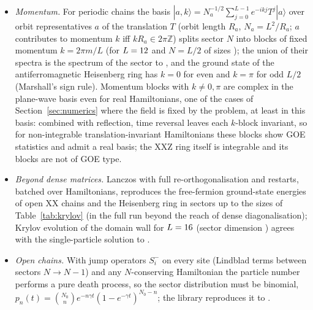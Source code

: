 \documentclass[11pt]{article}
\begin{document}
\begin{itemize}
level spacings in the middle of the spectrum crosses over from the GOE value $0.5307$ to the Poisson value
$2\ln2-1\approx0.3863$~\cite{oganesyan2007,atas2013} as $W$ grows; at these sizes this is a finite-size crossover,
the standard spectral diagnostic used in studies of many-body localisation.
Here the batch dimension holds the disorder realisations
( per point).
\item \emph{Momentum.} For periodic chains the basis $|a,k\rangle=N_a^{-1/2}\sum_{j=0}^{L-1}e^{-ikj}T^j|a\rangle$ over
orbit representatives $a$ of the translation $T$ (orbit length $R_a$, $N_a=L^2/R_a$; $a$ contributes to momentum $k$
iff $kR_a\in2\pi\mathbb Z$) splits sector $N$ into blocks of fixed momentum
$k=2\pi m/L$ (for $L=\IfFileExists{generated/chains.tex}{\ChainMomL}{12}$ and $N=L/2$ of sizes
); the union of their spectra is the
spectrum of the sector to , and the ground state of
the antiferromagnetic Heisenberg ring has $k=0$ for even and $k=\pi$ for odd $L/2$ (Marshall's sign rule). Momentum
blocks with $k\ne0,\pi$ are complex in the plane-wave basis even for real Hamiltonians, one of the cases of
Section~\ref{sec:numerics} where the field is fixed by the problem, at least in this basis: combined with reflection,
time reversal leaves each $k$-block invariant, so for non-integrable translation-invariant Hamiltonians these blocks
show GOE statistics and admit a real basis; the XXZ ring itself is integrable and its blocks are not of GOE type.
\item \emph{Beyond dense matrices.} Lanczos with full re-orthogonalisation and restarts, batched over
Hamiltonians, reproduces the free-fermion ground-state energies of open XX chains and the Heisenberg ring in
sectors up to the sizes of Table~\ref{tab:krylov} (in the full run beyond the reach of dense diagonalisation); Krylov evolution of the domain wall for
$L=\IfFileExists{generated/chains.tex}{\ChainKDWL}{16}$ (sector dimension
) agrees with the single-particle solution to
.
\item \emph{Open chains.} With jump operators $S^-_i$ on every site (Lindblad terms between sectors $N\to N-1$)
and any $N$-conserving Hamiltonian the particle number performs a pure death process, so the sector
distribution must be binomial, $p_n(t)=\binom{N_0}{n}e^{-n\gamma t}(1-e^{-\gamma t})^{N_0-n}$; the library
reproduces it to .
\end{itemize}
\end{document}
